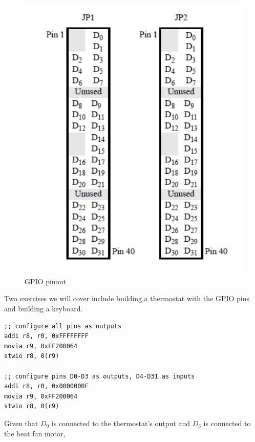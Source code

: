 \documentclass[../notes.tex]{subfiles}
\begin{document}
\begin{figure}[H]
	\centering
	\includegraphics[width=0.8\linewidth]{img/image_2022-10-06-13-47-12.png}
	\caption{GPIO pinout}
\end{figure}


Two exercises we will cover include building a thermostat with the GPIO pins and building a keyboard.



\begin{listing}[H]
\begin{verbatim}
;; configure all pins as outputs
addi r8, r0, 0xFFFFFFFF
movia r9, 0xFF200064
stwio r8, 0(r9)

;; configure pins D0-D3 as outputs, D4-D31 as inputs
addi r8, r0, 0x0000000F
movia r9, 0xFF200064
stwio r8, 0(r9)
\end{verbatim}
\end{listing}




Given that $ D_0 $ is connected to the thermostat's output and $ D_3 $ is connected to the heat fan motor,
\end{document}
